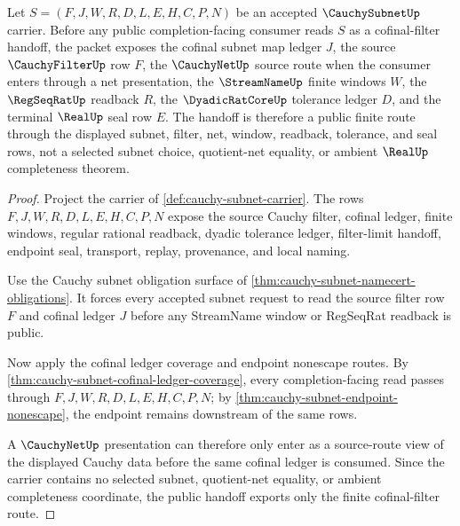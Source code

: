 \begin{theorem}
\label{thm:cauchy-subnet-public-cofinal-filter-handoff}
Let $S=(F,J,W,R,D,L,E,H,C,P,N)$ be an accepted $\CauchySubnetUp$ carrier. Before any public completion-facing consumer reads $S$ as a cofinal-filter handoff, the packet exposes the cofinal subnet map ledger $J$, the source $\CauchyFilterUp$ row $F$, the $\CauchyNetUp$ source route when the consumer enters through a net presentation, the $\StreamNameUp$ finite windows $W$, the $\RegSeqRatUp$ readback $R$, the $\DyadicRatCoreUp$ tolerance ledger $D$, and the terminal $\RealUp$ seal row $E$. The handoff is therefore a public finite route through the displayed subnet, filter, net, window, readback, tolerance, and seal rows, not a selected subnet choice, quotient-net equality, or ambient $\RealUp$ completeness theorem.
\end{theorem}
\begin{proof}
Project the carrier of \autoref{def:cauchy-subnet-carrier}. The rows $F,J,W,R,D,L,E,H,C,P,N$ expose the source Cauchy filter, cofinal ledger, finite windows, regular rational readback, dyadic tolerance ledger, filter-limit handoff, endpoint seal, transport, replay, provenance, and local naming.

Use the Cauchy subnet obligation surface of \autoref{thm:cauchy-subnet-namecert-obligations}. It forces every accepted subnet request to read the source filter row $F$ and cofinal ledger $J$ before any StreamName window or RegSeqRat readback is public.

Now apply the cofinal ledger coverage and endpoint nonescape routes. By \autoref{thm:cauchy-subnet-cofinal-ledger-coverage}, every completion-facing read passes through $F,J,W,R,D,L,E,H,C,P,N$; by \autoref{thm:cauchy-subnet-endpoint-nonescape}, the endpoint remains downstream of the same rows.

A $\CauchyNetUp$ presentation can therefore only enter as a source-route view of the displayed Cauchy data before the same cofinal ledger is consumed. Since the carrier contains no selected subnet, quotient-net equality, or ambient completeness coordinate, the public handoff exports only the finite cofinal-filter route.
\end{proof}

